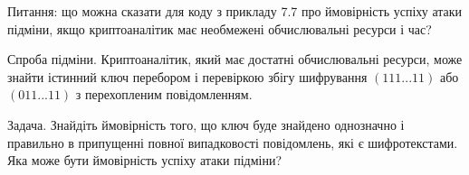 Питання: що можна сказати для коду з прикладу 7.7 про ймовірність
успіху атаки підміни, якщо криптоаналітик має необмежені обчислювальні
ресурси і час?

Спроба підміни. Криптоаналітик, який має достатні обчислювальні
ресурси, може знайти істинний ключ перебором і перевіркою збігу
шифрування $(111...11)$ або $(011...11)$ з перехопленим повідомленням.

Задача. Знайдіть ймовірність того, що ключ буде знайдено однозначно і
правильно в припущенні повної випадковості повідомлень, які є
шифротекстами. Яка може бути ймовірність успіху атаки підміни?


